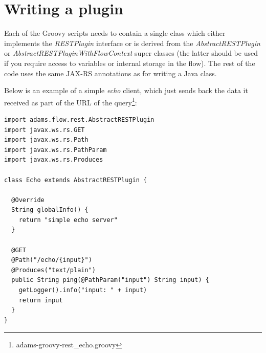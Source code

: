 \documentclass[a4paper]{book}
\begin{document}
\newpage
\section{Writing a plugin}
Each of the Groovy scripts needs to contain a single class which either
implements the \textit{RESTPlugin} interface or is derived from the
\textit{AbstractRESTPlugin} or \textit{AbstractRESTPluginWithFlowContext}
super classes (the latter should be used if you require access to variables or
internal storage in the flow). The rest of the code uses the same JAX-RS annotations
as for writing a Java class.

Below is an example of a simple \textit{echo} client, which just sends
back the data it received as part of the URL of the
query\footnote{adams-groovy-rest\_echo.groovy}:
\begin{verbatim}
import adams.flow.rest.AbstractRESTPlugin
import javax.ws.rs.GET
import javax.ws.rs.Path
import javax.ws.rs.PathParam
import javax.ws.rs.Produces

class Echo extends AbstractRESTPlugin {

  @Override
  String globalInfo() {
    return "simple echo server"
  }

  @GET
  @Path("/echo/{input}")
  @Produces("text/plain")
  public String ping(@PathParam("input") String input) {
    getLogger().info("input: " + input)
    return input
  }
}
\end{verbatim}


\end{document}
